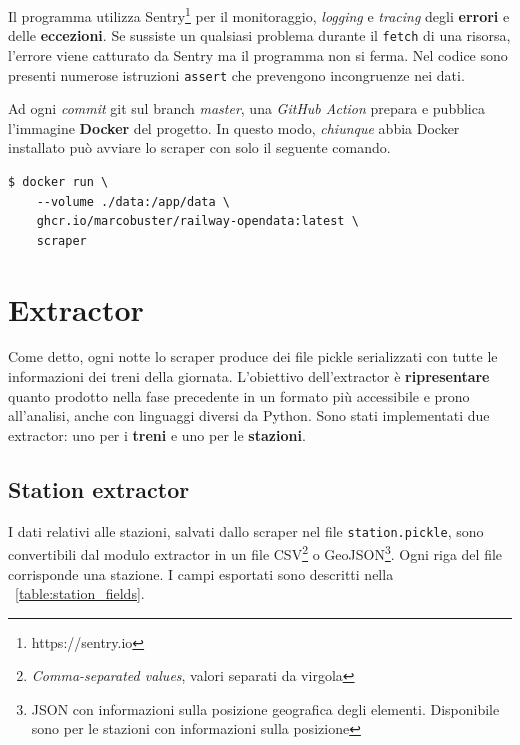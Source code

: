 \documentclass[12pt,italian]{report}
\begin{document}
Il programma utilizza Sentry\footnote{https://sentry.io} per il
monitoraggio, \textit{logging} e \textit{tracing} degli
\textbf{errori} e delle \textbf{eccezioni}.  Se sussiste un qualsiasi
problema durante il \texttt{fetch} di una risorsa, l'errore viene
catturato da Sentry ma il programma non si ferma.  Nel codice sono
presenti numerose istruzioni \texttt{assert} che prevengono
incongruenze nei dati.

Ad ogni \textit{commit} git sul branch \textit{master}, una
\textit{GitHub Action} prepara e pubblica l'immagine \textbf{Docker}
del progetto.  In questo modo, \textit{chiunque} abbia Docker
installato può avviare lo scraper con solo il seguente comando.

\begin{verbatim}
$ docker run \
    --volume ./data:/app/data \
    ghcr.io/marcobuster/railway-opendata:latest \
    scraper
\end{verbatim}

\section{Extractor}

Come detto, ogni notte lo scraper produce dei file pickle serializzati
con tutte le informazioni dei treni della giornata.  L'obiettivo
dell'extractor è \textbf{ripresentare} quanto prodotto nella fase
precedente in un formato più accessibile e prono all'analisi, anche
con linguaggi diversi da Python.  Sono stati implementati due
extractor: uno per i \textbf{treni} e uno per le \textbf{stazioni}.

\subsection{Station extractor}

I dati relativi alle stazioni, salvati dallo scraper nel file
\texttt{station.pickle}, sono convertibili dal modulo extractor in un
file CSV\footnote{\textit{Comma-separated values}, valori separati da
    virgola} o GeoJSON\footnote{JSON con informazioni sulla posizione
    geografica degli elementi.  Disponibile sono per le stazioni con
    informazioni sulla posizione}.  Ogni riga del file corrisponde una
stazione.  I campi esportati sono descritti nella \tablename\
\ref{table:station_fields}.
\end{document}

